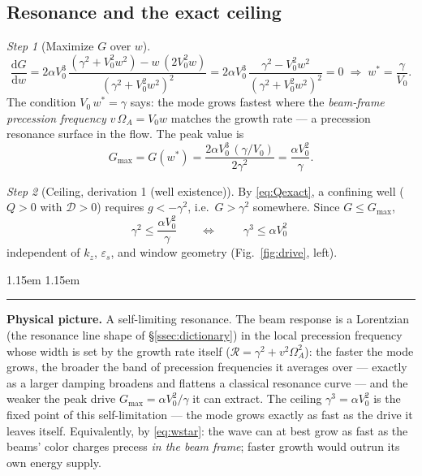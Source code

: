 \documentclass[11pt,a4paper]{article}
\numberwithin{equation}{section}
\theoremstyle{remark}
\newtheorem{step}{Step}[subsection]
\newenvironment{intuition}%
{\par\medskip\noindent
 \begin{list}{}{\leftmargin 1.15em \rightmargin 1.15em \listparindent 0pt
 \itemindent 0pt \parsep 2pt \topsep 2pt}\item\relax
 \small\textcolor{intu}{\rule[-0.6ex]{2.6pt}{2.4ex}}\hspace{0.55em}%
 \textcolor{intu}{\textbf{Physical picture.}}\hspace{0.5em}\ignorespaces}%
{\end{list}\medskip}
\newcommand{\eps}{\varepsilon_s}                 %
\newcommand{\Vo}{V_0}
\newcommand{\kz}{k_z}
\newcommand{\OmA}{\Omega_A}
\newcommand{\D}{\mathcal{D}}
\newcommand{\R}{\mathcal{R}}
\newcommand{\dd}{\mathrm{d}}
\begin{document}
\subsection{Resonance and the exact ceiling}
\label{ssec:resonance}

\begin{step}[Maximize $G$ over $w$]
\begin{equation}
\frac{\dd G}{\dd w}
=2\alpha\Vo^3\,\frac{(\gamma^2+\Vo^2w^2)-w\,(2\Vo^2w)}{(\gamma^2+\Vo^2w^2)^2}
=2\alpha\Vo^3\,\frac{\gamma^2-\Vo^2w^2}{(\gamma^2+\Vo^2w^2)^2}=0
\;\Longrightarrow\;
w^*=\frac{\gamma}{\Vo}.
\label{eq:wstar}
\end{equation}
The condition $\Vo\,w^*=\gamma$ says: the mode grows fastest where the
\emph{beam-frame precession frequency} $v\,\OmA=\Vo w$ matches the growth
rate --- a precession resonance surface in the flow. The peak value is
\begin{equation}
G_{\max}=G(w^*)=\frac{2\alpha\Vo^3\,(\gamma/\Vo)}{2\gamma^2}
=\frac{\alpha\Vo^2}{\gamma}.
\label{eq:Gmax}
\end{equation}
\end{step}

\begin{step}[Ceiling, derivation 1 (well existence)]
By \eqref{eq:Qexact}, a confining well ($Q>0$ with $\D>0$) requires
$g<-\gamma^2$, i.e.\ $G>\gamma^2$ somewhere. Since $G\le G_{\max}$,
\begin{equation}
\gamma^2\le\frac{\alpha\Vo^2}{\gamma}
\qquad\Longleftrightarrow\qquad
\boxed{\;\gamma^3\le\alpha\Vo^2\;}
\label{eq:ceiling}
\end{equation}
independent of $\kz$, $\eps$, and window geometry
(Fig.~\ref{fig:drive}, left).
\end{step}

\begin{intuition}
A self-limiting resonance. The beam response is a Lorentzian
(the resonance line shape of \S\ref{ssec:dictionary}) in the
local precession frequency whose width is set by the growth rate itself
($\R=\gamma^2+v^2\OmA^2$): the faster the mode grows, the broader the
band of precession frequencies it averages over --- exactly as a larger
damping broadens and flattens a classical resonance curve --- and the
weaker the peak drive $G_{\max}=\alpha\Vo^2/\gamma$ it can extract. The ceiling
$\gamma^3=\alpha\Vo^2$ is the fixed point of this self-limitation ---
the mode grows exactly as fast as the drive it leaves itself.
Equivalently, by \eqref{eq:wstar}: the wave can at best grow as fast as
the beams' color charges precess \emph{in the beam frame}; faster growth
would outrun its own energy supply.
\end{intuition}
\end{document}
